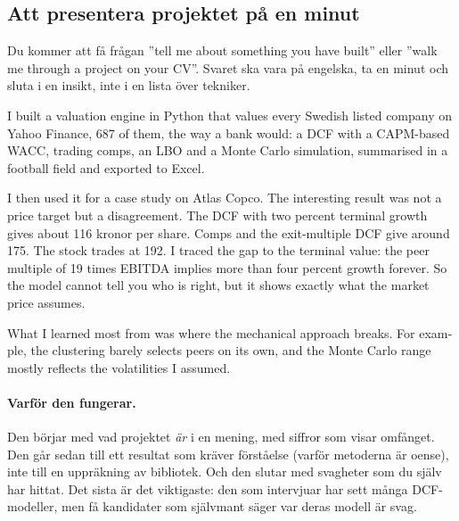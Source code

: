 \subsection{Att presentera projektet på en minut}

Du kommer att få frågan ”tell me about something you have built” eller ”walk me through a
project on your CV”. Svaret ska vara på engelska, ta en minut och sluta i en insikt, inte i en
lista över tekniker.

\begin{tcolorbox}[enhanced,colback=accent!4,colframe=accent,boxrule=0.5pt,arc=2pt,
  left=10pt,right=10pt,top=8pt,bottom=8pt,title={The pitch (about 60 seconds)},
  fonttitle=\sffamily\bfseries\small,coltitle=white,colbacktitle=accent,
  before upper={\setlength{\parskip}{0.5\baselineskip}}]
\begin{english}
I built a valuation engine in Python that values every
Swedish listed company on Yahoo Finance, 687 of them, the way a bank would: a DCF with a
CAPM-based WACC, trading comps, an LBO and a Monte Carlo simulation, summarised in a football
field and exported to Excel.

I then used it for a case study on Atlas Copco. The interesting result was not a price target
but a disagreement. The DCF with two percent terminal growth gives about 116 kronor per share.
Comps and the exit-multiple DCF give around 175. The stock trades at 192. I traced the gap to
the terminal value: the peer multiple of 19 times EBITDA implies more than four percent growth
forever. So the model cannot tell you who is right, but it shows exactly what the market price
assumes.

What I learned most from was where the mechanical approach breaks. For example, the clustering
barely selects peers on its own, and the Monte Carlo range mostly reflects the volatilities I
assumed.
\end{english}
\end{tcolorbox}

\paragraph{Varför den fungerar.} Den börjar med vad projektet \emph{är} i en mening, med
siffror som visar omfånget. Den går sedan till ett resultat som kräver förståelse (varför
metoderna är oense), inte till en uppräkning av bibliotek. Och den slutar med svagheter som du
själv har hittat. Det sista är det viktigaste: den som intervjuar har sett många DCF-modeller,
men få kandidater som självmant säger var deras modell är svag.

